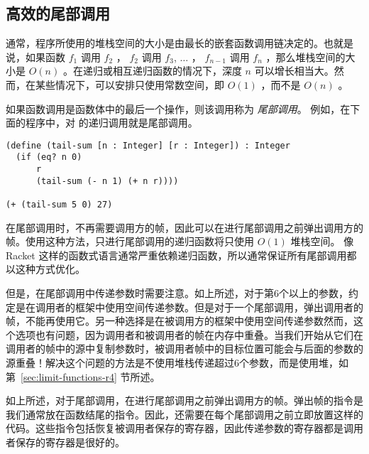 \documentclass[11pt]{book}
\begin{document}

\subsection{高效的尾部调用}
\label{sec:tail-call}

通常，程序所使用的堆栈空间的大小是由最长的嵌套函数调用链决定的。也就是说，如果函数
$f_1$ 调用 $f_2$ ， $f_2$ 调用 $f_3$, $\ldots$ ， $f_{n-1}$ 调用
$f_n$ ，那么堆栈空间的大小是 $O(n)$ 。在递归或相互递归函数的情况下，深度
$n$ 可以增长相当大。然而，在某些情况下，可以安排只使用常数空间，即 $O(1)$ ，而不是 $O(n)$ 。

如果函数调用是函数体中的最后一个操作，则该调用称为 \emph{尾部调用}。
例如，在下面的程序中，对  的递归调用就是尾部调用。
\begin{center}
\begin{lstlisting}
(define (tail-sum [n : Integer] [r : Integer]) : Integer
  (if (eq? n 0) 
      r
      (tail-sum (- n 1) (+ n r))))

(+ (tail-sum 5 0) 27)
\end{lstlisting}
\end{center}
在尾部调用时，不再需要调用方的帧，因此可以在进行尾部调用之前弹出调用方的帧。使用这种方法，只进行尾部调用的递归函数将只使用 $O(1)$ 堆栈空间。 像 Racket 这样的函数式语言通常严重依赖递归函数，所以通常保证所有尾部调用都以这种方式优化。

但是，在尾部调用中传递参数时需要注意。如上所述，对于第6个以上的参数，约定是在调用者的框架中使用空间传递参数。但是对于一个尾部调用，弹出调用者的帧，不能再使用它。另一种选择是在被调用方的框架中使用空间传递参数然而，这个选项也有问题，因为调用者和被调用者的帧在内存中重叠。当我们开始从它们在调用者的帧中的源中复制参数时，被调用者帧中的目标位置可能会与后面的参数的源重叠！解决这个问题的方法是不使用堆栈传递超过6个参数，而是使用堆，如第~\ref{sec:limit-functions-r4} 节所述。

如上所述，对于尾部调用，在进行尾部调用之前弹出调用方的帧。弹出帧的指令是我们通常放在函数结尾的指令。因此，还需要在每个尾部调用之前立即放置这样的代码。这些指令包括恢复被调用者保存的寄存器，因此传递参数的寄存器都是调用者保存的寄存器是很好的。
\end{document}
